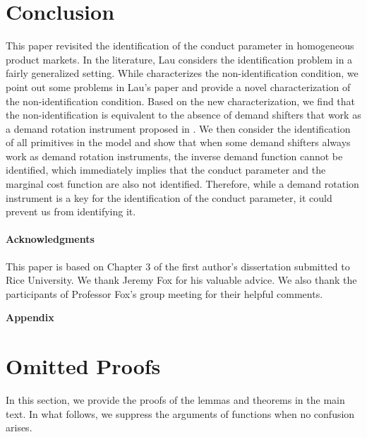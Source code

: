 \documentclass[11pt, a4paper]{article}
\newcommand{\appendixsection}{%
  \setcounter{section}{0}%
  \renewcommand{\thesection}{\Alph{section}}%
  \renewcommand{\thetheorem}{\Alph{section}.\arabic{theorem}}%
  \renewcommand{\thelemma}{\Alph{section}.\arabic{lemma}}%
  \renewcommand{\theproposition}{\Alph{section}.\arabic{proposition}}%
  \renewcommand{\thecorollary}{\Alph{section}.\arabic{corollary}}%
  \renewcommand{\thedefinition}{\Alph{section}.\arabic{definition}}%
}
\begin{document}
\section{Conclusion}\label{sec:conclusion}

This paper revisited the identification of the conduct parameter in homogeneous product markets.
In the literature, Lau considers the identification problem in a fairly generalized setting.
While \citet{lauIdentifying1982} characterizes the non-identification condition, we point out some problems in Lau's paper and provide a novel characterization of the non-identification condition.
Based on the new characterization, we find that the non-identification is equivalent to the absence of demand shifters that work as a demand rotation instrument proposed in \citet{bresnahanOligopoly1982}.
We then consider the identification of all primitives in the model and show that when some demand shifters always work as demand rotation instruments, the inverse demand function cannot be identified, which immediately implies that the conduct parameter and the marginal cost function are also not identified.
Therefore, while a demand rotation instrument is a key for the identification of the conduct parameter, it could prevent us from identifying it.



\paragraph{Acknowledgments}
This paper is based on Chapter 3 of the first author's dissertation submitted to Rice University.
We thank Jeremy Fox for his valuable advice.
We also thank the participants of Professor Fox's group meeting for their helpful comments.







\newpage
\appendix
\appendixsection
{}

\begin{center}
\huge\textbf{Appendix}
\end{center}
\vspace{1mm}

\section{Omitted Proofs}\label{appendix:proof}
In this section, we provide the proofs of the lemmas and theorems in the main text.
In what follows, we suppress the arguments of functions when no confusion arises.
\end{document}

